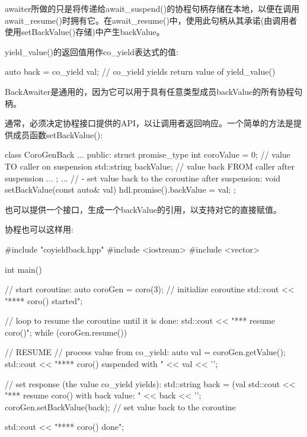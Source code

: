 awaiter所做的只是将传递给await\_suspend()的协程句柄存储在本地，以便在调用await\_resume()时拥有它。在await\_resume()中，使用此句柄从其承诺(由调用者使用setBackValue()存储)中产生backValue。

yield\_value()的返回值用作co\_yield表达式的值:

\begin{cpp}
auto back = co_yield val; // co_yield yields return value of yield_value()
\end{cpp}

BackAwaiter是通用的，因为它可以用于具有任意类型成员backValue的所有协程句柄。


通常，必须决定协程接口提供的API，以让调用者返回响应。一个简单的方法是提供成员函数setBackValue():

\begin{cpp}
class CoroGenBack {
	...
	public:
	struct promise_type {
		int coroValue = 0; // value TO caller on suspension
		std::string backValue; // value back FROM caller after suspension
		...
	};
	...
	// - set value back to the coroutine after suspension:
	void setBackValue(const auto& val) {
		hdl.promise().backValue = val;
	}
};
\end{cpp}

也可以提供一个接口，生成一个backValue的引用，以支持对它的直接赋值。


协程也可以这样用:


\begin{cpp}
#include "coyieldback.hpp"
#include <iostream>
#include <vector>

int main()
{
	// start coroutine:
	auto coroGen = coro(3); // initialize coroutine
	std::cout << "**** coro() started\n";

	// loop to resume the coroutine until it is done:
	std::cout << "\n**** resume coro()\n";
	while (coroGen.resume()) { // RESUME
		// process value from co_yield:
		auto val = coroGen.getValue();
		std::cout << "**** coro() suspended with " << val << '\n';

		// set response (the value co_yield yields):
		std::string back = (val %
		std::cout << "\n**** resume coro() with back value: " << back << '\n';
		coroGen.setBackValue(back); // set value back to the coroutine
	}

	std::cout << "**** coro() done\n";
}
\end{cpp}

